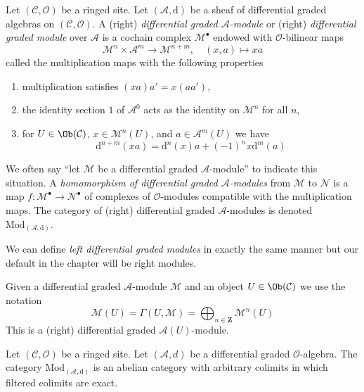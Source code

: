 \begin{definition}
\label{definition-dgm}
Let $(\mathcal{C}, \mathcal{O})$ be a ringed site.
Let $(\mathcal{A}, \text{d})$ be a sheaf of differential graded algebras
on $(\mathcal{C}, \mathcal{O})$.
A (right) {\it differential graded $\mathcal{A}$-module} or (right)
{\it differential graded module} over $\mathcal{A}$
is a cochain complex $\mathcal{M}^\bullet$ endowed with
$\mathcal{O}$-bilinear maps
$$
\mathcal{M}^n \times \mathcal{A}^m \to \mathcal{M}^{n + m},\quad
(x, a) \longmapsto xa
$$
called the multiplication maps with the following properties
\begin{enumerate}
\item multiplication satisfies $(xa)a' = x(aa')$,
\item the identity section $1$ of $\mathcal{A}^0$
acts as the identity on $\mathcal{M}^n$ for all $n$,
\item for $U \in \Ob(\mathcal{C})$, $x \in \mathcal{M}^n(U)$, and
$a \in \mathcal{A}^m(U)$ we have
$$
\text{d}^{n + m}(xa) = \text{d}^n(x)a + (-1)^n x\text{d}^m(a)
$$
\end{enumerate}
We often say ``let $\mathcal{M}$ be a differential graded
$\mathcal{A}$-module'' to indicate this situation.
A {\it homomorphism of differential graded $\mathcal{A}$-modules}
from $\mathcal{M}$ to $\mathcal{N}$ is a map
$f : \mathcal{M}^\bullet \to \mathcal{N}^\bullet$ of complexes
of $\mathcal{O}$-modules compatible with the multiplication maps.
The category of (right) differential graded $\mathcal{A}$-modules
is denoted $\text{Mod}_{(\mathcal{A}, \text{d})}$.
\end{definition}

\noindent
We can define {\it left differential graded modules} in exactly the same manner
but our default in the chapter will be right modules.

\medskip\noindent
Given a differential graded $\mathcal{A}$-module $\mathcal{M}$
and an object $U \in \Ob(\mathcal{C})$ we use the notation
$$
\mathcal{M}(U) =
\Gamma(U, \mathcal{M}) =
\bigoplus\nolimits_{n \in \mathbf{Z}} \mathcal{M}^n(U)
$$
This is a (right) differential graded $\mathcal{A}(U)$-module.

\begin{lemma}
\label{lemma-dgm-abelian}
Let $(\mathcal{C}, \mathcal{O})$ be a ringed site.
Let $(\mathcal{A}, d)$ be a differential graded $\mathcal{O}$-algebra.
The category $\text{Mod}_{(\mathcal{A}, \text{d})}$ is an abelian category
with arbitrary colimits in which filtered colimits are exact.
\end{lemma}

